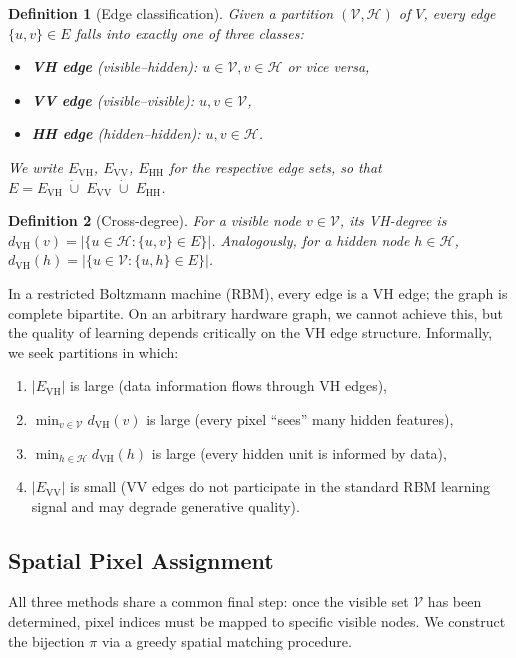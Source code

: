 \documentclass[11pt,a4paper]{article}
\newtheorem{definition}{Definition}
\newcommand{\VV}{\mathcal{V}}
\newcommand{\HH}{\mathcal{H}}
\begin{document}
\begin{definition}[Edge classification]
Given a partition $(\VV,\HH)$ of $V$, every edge $\{u,v\}\in E$ falls into exactly one of three classes:
\begin{itemize}[nosep]
  \item \textbf{VH edge} (visible--hidden): $u\in\VV, v\in\HH$ or vice versa,
  \item \textbf{VV edge} (visible--visible): $u,v\in\VV$,
  \item \textbf{HH edge} (hidden--hidden): $u,v\in\HH$.
\end{itemize}
We write $E_{\mathrm{VH}}$, $E_{\mathrm{VV}}$, $E_{\mathrm{HH}}$ for the respective edge sets, so that $E = E_{\mathrm{VH}} \;\dot\cup\; E_{\mathrm{VV}} \;\dot\cup\; E_{\mathrm{HH}}$.
\end{definition}

\begin{definition}[Cross-degree]\label{def:crossdeg}
For a visible node $v\in\VV$, its \emph{VH-degree} is $d_{\mathrm{VH}}(v) = |\{u\in\HH : \{u,v\}\in E\}|$.  Analogously, for a hidden node $h\in\HH$, $d_{\mathrm{VH}}(h) = |\{u\in\VV : \{u,h\}\in E\}|$.
\end{definition}

In a restricted Boltzmann machine (RBM), every edge is a VH edge; the graph is complete bipartite.  On an arbitrary hardware graph, we cannot achieve this, but the quality of learning depends critically on the VH edge structure.  Informally, we seek partitions in which:
\begin{enumerate}[nosep]
  \item $|E_{\mathrm{VH}}|$ is large (data information flows through VH edges),
  \item $\min_{v\in\VV} d_{\mathrm{VH}}(v)$ is large (every pixel ``sees'' many hidden features),
  \item $\min_{h\in\HH} d_{\mathrm{VH}}(h)$ is large (every hidden unit is informed by data),
  \item $|E_{\mathrm{VV}}|$ is small (VV edges do not participate in the standard RBM learning signal and may degrade generative quality).
\end{enumerate}

\subsection{Spatial Pixel Assignment}\label{sec:pixelass}

All three methods share a common final step: once the visible set $\VV$ has been determined, pixel indices must be mapped to specific visible nodes.  We construct the bijection $\pi$ via a greedy spatial matching procedure.
\end{document}

